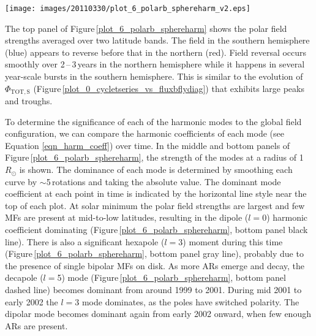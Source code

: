 \documentclass[namedreferences]{solarphysics}
\begin{document}
\begin{article}
\begin{figure*}[!t]

\texttt{[image: images/20110330/plot\_6\_polarb\_sphereharm\_v2.eps]}
\caption{\emph{Top}: Polar field strengths in the northern (red) and southern (blue) hemispheres. \emph{Middle}: PFSS spherical harmonic coefficients for the monopolar ($C_{0,0}$; gray line), quadrupolar ($C_{2,0}$; gray line) and $l$$=$4 ($C_{4,0}$; dashed line) modes. The dominance of the $C_{2,0}$ and $C_{4,0}$ modes is indicated by the horizontal solid and dashed lines, respectively. \emph{Bottom}: PFSS spherical harmonic coefficients for the dipolar ($C_{1,0}$; black line), $l$$=$3 ($C_{3,0}$; gray line) and $l$$=$5 ($C_{5,0}$; dashed line) modes. The coefficients are determined for a height of $r=1R_{\odot}$ (i.e., the solar surface).}
\label{plot_6_polarb_sphereharm}
\end{figure*}


The top panel of Figure\,\ref{plot_6_polarb_sphereharm} shows the polar field strengths averaged over two latitude bands. The field in the southern hemisphere (blue) appears to reverse before that in the northern (red). Field reversal occurs smoothly over 2\,--\,3\,years in the northern hemisphere while it happens in several year-scale bursts in the southern hemisphere. This is similar to the evolution of $\Phi_{\mathrm{TOT,S}}$ (Figure\,\ref{plot_0_cycletseries_vs_fluxbflydiag}) that exhibits large peaks and troughs.

To determine the significance of each of the harmonic modes to the global field configuration, we can compare the harmonic coefficients of each mode (see Equation \ref{eqn_harm_coeff}) over time. In the middle and bottom panels of Figure\,\ref{plot_6_polarb_sphereharm}, the strength of the modes at a radius of 1\,$R_{\odot}$ is shown. The dominance of each mode is determined by smoothing each curve by $\sim$5\,rotations and taking the absolute value. The dominant mode coefficient at each point in time is indicated by the horizontal line style near the top of each plot. At solar minimum the polar field strengths are largest and few MFs are present at mid-to-low latitudes, resulting in the dipole ($l$$=$0) harmonic coefficient dominating (Figure\,\ref{plot_6_polarb_sphereharm}, bottom panel black line). There is also a significant hexapole ($l$$=$3) moment during this time (Figure\,\ref{plot_6_polarb_sphereharm}, bottom panel gray line), probably due to the presence of single bipolar MFs on disk. As more ARs emerge and decay, the decapole ($l$$=$5) mode (Figure\,\ref{plot_6_polarb_sphereharm}, bottom panel dashed line) becomes dominant from around 1999 to 2001. During mid 2001 to early 2002 the $l$$=$3 mode dominates, as the poles have switched polarity. The dipolar mode becomes dominant again from early 2002 onward, when few enough ARs are present.


\end{article}
\end{document}
